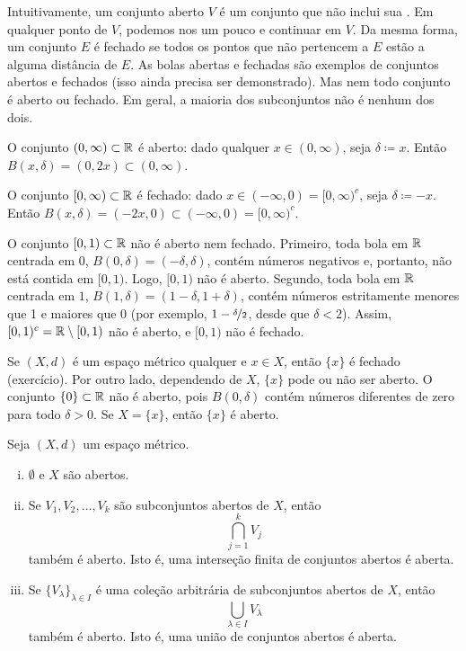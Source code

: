 Intuitivamente, um conjunto aberto $V$ é um conjunto que não inclui sua
.
Em qualquer ponto de $V$, podemos nos  um pouco e
continuar em $V$. Da mesma forma, um conjunto $E$ é fechado se todos os pontos
que não pertencem a $E$ estão a alguma distância de $E$.
As bolas abertas e fechadas são exemplos de conjuntos abertos e fechados
(isso ainda precisa ser demonstrado).
Mas nem todo conjunto é aberto ou fechado. Em geral, a maioria dos
subconjuntos não é nenhum dos dois.

\begin{example}
O conjunto $(0,\infty) \subset {\mathbb{R}}$ é aberto: dado qualquer $x \in (0,\infty)$,
seja $\delta \coloneqq x$. Então $B(x,\delta) = (0,2x) \subset (0,\infty)$.

O conjunto $[0,\infty) \subset {\mathbb{R}}$ é fechado: dado $x \in (-\infty,0) =
[0,\infty)^c$,
seja $\delta \coloneqq -x$. Então $B(x,\delta) = (-2x,0) \subset
(-\infty,0) = [0,\infty)^c$.

O conjunto $[0,1) \subset {\mathbb{R}}$ não é aberto nem fechado. Primeiro, toda bola
em ${\mathbb{R}}$ centrada em $0$, $B(0,\delta) = (-\delta,\delta)$, contém números
negativos e, portanto, não está contida em $[0,1)$. Logo, $[0,1)$ não é
aberto. Segundo, toda bola em ${\mathbb{R}}$ centrada em $1$,
$B(1,\delta) = (1-\delta,1+\delta)$, contém números estritamente menores
que 1 e maiores que 0 (por exemplo, $1-\nicefrac{\delta}{2}$, desde que
$\delta < 2$).
Assim, $[0,1)^c = {\mathbb{R}} \setminus [0,1)$ não é aberto, e $[0,1)$ não é fechado.

Se $(X,d)$ é um espaço métrico qualquer e $x \in X$, então $\{ x \}$ é
fechado (exercício).
Por outro lado, dependendo de $X$, $\{ x \}$ pode ou não ser aberto.
O conjunto $\{ 0 \} \subset {\mathbb{R}}$ não é aberto, pois $B(0,\delta)$ contém
números diferentes de zero para todo $\delta > 0$.
Se $X=\{ x \}$, então $\{ x \}$ é aberto.
\end{example}

\begin{prop} \label{prop:topology:open}
Seja $(X,d)$ um espaço métrico.
\begin{enumerate}[(i)]
\item \label{topology:openi} $\emptyset$ e $X$ são abertos.
\item \label{topology:openii} Se $V_1, V_2, \ldots, V_k$ são subconjuntos abertos de $X$, então
\begin{equation*}
\bigcap_{j=1}^k V_j
\end{equation*}
também é aberto. Isto é, uma interseção finita de conjuntos abertos é aberta.
\item \label{topology:openiii} Se $\{ V_\lambda \}_{\lambda \in I}$ é
uma coleção arbitrária de subconjuntos abertos de $X$, então
\begin{equation*}
\bigcup_{\lambda \in I} V_\lambda
\end{equation*}
também é aberto. Isto é, uma união de conjuntos abertos é aberta.
\end{enumerate}
\end{prop}

